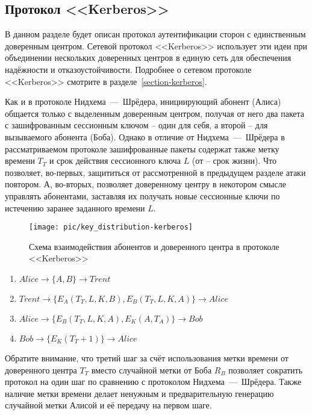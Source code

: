 \subsection{Протокол <<Kerberos>>}

В данном разделе будет описан протокол аутентификации сторон с единственным доверенным центром. Сетевой протокол <<Kerberos>> использует эти идеи при объединении нескольких доверенных центров в единую сеть для обеспечения надёжности и отказоустойчивости. Подробнее о сетевом протоколе <<Kerberos>> смотрите в разделе~\ref{section-kerberos}.

Как и в протоколе Нидхема~---~Шрёдера, инициирующий абонент (Алиса) общается только с выделенным доверенным центром, получая от него два пакета с зашифрованным сессионным ключом -- один для себя, а второй -- для вызываемого абонента (Боба). Однако в отличие от Нидхема~---~Шрёдера в рассматриваемом протоколе зашифрованные пакеты содержат также метку времени $T_T$ и срок действия сессионного ключа $L$ (от  -- срок жизни). Что позволяет, во-первых, защититься от рассмотренной в предыдущем разделе атаки повтором. А, во-вторых, позволяет доверенному центру в некотором смысле управлять абонентами, заставляя их получать новые сессионные ключи по истечению заранее заданного времени $L$.

\begin{figure}[!htb]
    \centering
    \texttt{[image: pic/key\_distribution-kerberos]}
    \caption{Схема взаимодействия абонентов и доверенного центра в протоколе <<Kerberos>>\label{fig:key_distribution-kerberos}}
\end{figure}

\begin{enumerate}
	\item $ Alice	\rightarrow \{ A, B \}									\rightarrow Trent $
	\item $ Trent	\rightarrow \{ E_A \left( T_T, L, K, B \right), E_B \left( T_T, L, K, A \right) \}	\rightarrow Alice $
	\item $ Alice	\rightarrow \{ E_B \left( T_T, L, K, A \right), E_K \left( A, T_A \right) \}		\rightarrow Bob $
	\item $ Bob	\rightarrow \{ E_K \left( T_T + 1 \right) \}						\rightarrow Alice $
\end{enumerate}

Обратите внимание, что третий шаг за счёт использования метки времени от доверенного центра $T_T$ вместо случайной метки от Боба $R_B$ позволяет сократить протокол на один шаг по сравнению с протоколом Нидхема~---~Шрёдера. Также наличие метки времени делает ненужным и предварительную генерацию случайной метки Алисой и её передачу на первом шаге.

